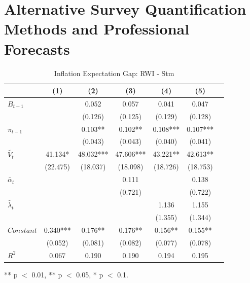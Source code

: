\documentclass[review]{elsarticle}
\begin{document}

\section{Alternative Survey Quantification Methods and Professional Forecasts}

\begin{table}[!ht]
\centering 
  \caption{Inflation Expectation Gap: RWI - Stm} 
  \label{tab:Inflation Expectation Gap}
\begin{tabular}{l*{6}{c}}   
\toprule
                    & (1) & (2) & (3) & (4) & (5) \\
\midrule
$B_{t-1}$           &     & 0.052 & 0.057 & 0.041 & 0.047 \\
                    &     & (0.126) & (0.125) & (0.129) & (0.128) \\
$\pi_{t-1}$         &     & 0.103** & 0.102** & 0.108*** & 0.107*** \\
                    &     & (0.043) & (0.043) & (0.040) & (0.041) \\
$\tilde{V_t}$       & 41.134* & 48.032*** & 47.606*** & 43.221** & 42.613** \\
                    & (22.475) & (18.037) & (18.098) & (18.726) & (18.753) \\
$\tilde{\alpha_t}$  &     &     & 0.111 &     & 0.138 \\
                    &     &     & (0.721) &     & (0.722) \\
$\tilde{\lambda_t}$ &     &     &     & 1.136 & 1.155 \\
                    &     &     &     & (1.355) & (1.344) \\
$Constant$          & 0.340*** & 0.176** & 0.176** & 0.156** & 0.155** \\
                    & (0.052) & (0.081) & (0.082) & (0.077) & (0.078) \\
\midrule
$R^2$               & 0.067 & 0.190 & 0.190 & 0.194 & 0.195 \\
\bottomrule
\end{tabular} 
\parbox{0.8\textwidth}{\centering \small *** p $<$ 0.01, ** p $<$ 0.05, * p $<$ 0.1.}
\end{table}
\end{document}

